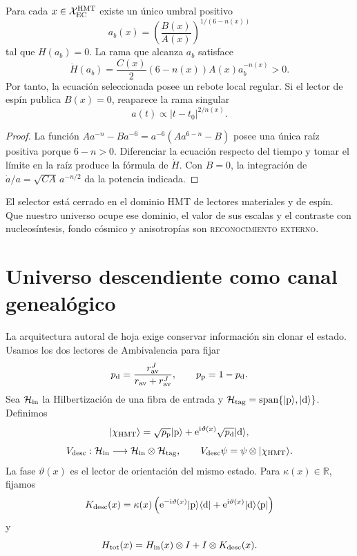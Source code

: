 \begin{theorem}
\label{thm:hmtf2-rebote-ec}
Para cada \(x\in\mathcal X_{\rm EC}^{\rm HMT}\) existe un único umbral
positivo
\[
 a_b(x)
 =\left(\frac{B(x)}{A(x)}\right)^{1/(6-n(x))}
\]
tal que \(H(a_b)=0\). La rama que alcanza \(a_b\) satisface
\[
 \dot H(a_b)
 =\frac{C(x)}2(6-n(x))A(x)a_b^{-n(x)}>0.
\]
Por tanto, la ecuación seleccionada posee un rebote local regular. Si el
lector de espín publica \(B(x)=0\), reaparece la rama singular
\[
 a(t)\propto|t-t_0|^{2/n(x)}.
\]
\end{theorem}

\begin{proof}
La función
\(A a^{-n}-B a^{-6}=a^{-6}(Aa^{6-n}-B)\) posee una única raíz positiva
porque \(6-n>0\). Diferenciar la ecuación respecto del tiempo y tomar el
límite en la raíz produce la fórmula de \(\dot H\). Con \(B=0\), la
integración de \(\dot a/a=\sqrt{CA}\,a^{-n/2}\) da la potencia indicada.
\end{proof}

El selector está cerrado en el dominio HMT de lectores materiales y de
espín. Que nuestro universo ocupe ese dominio, el valor de sus escalas y el
contraste con nucleosíntesis, fondo cósmico y anisotropías son
\textsc{reconocimiento externo}.

\section{Universo descendiente como canal genealógico}
\label{sec:hmtf2-universo-descendiente}

La arquitectura autoral de hoja exige conservar información sin clonar el
estado. Usamos los dos lectores de Ambivalencia para fijar
\[
 p_{\rm d}
 =\frac{r_{\rm av}^J}{r_{\rm av}+r_{\rm av}^J},
 \qquad
 p_{\rm p}=1-p_{\rm d}.
\]
Sea \(\mathcal H_{\rm in}\) la Hilbertización de una fibra de entrada y
\(\mathcal H_{\rm tag}=\operatorname{span}\{|{\rm p}\rangle,|{\rm d}\rangle\}\).
Definimos
\[
 |\chi_{\rm HMT}\rangle
 =\sqrt{p_{\rm p}}|{\rm p}\rangle
 +\mathrm e^{{\rm i}\vartheta(x)}
  \sqrt{p_{\rm d}}|{\rm d}\rangle,
\]
\[
 V_{\rm desc}:\mathcal H_{\rm in}
 \longrightarrow\mathcal H_{\rm in}\otimes\mathcal H_{\rm tag},
 \qquad
 V_{\rm desc}\psi=\psi\otimes|\chi_{\rm HMT}\rangle.
\]
La fase \(\vartheta(x)\) es el lector de orientación del mismo estado. Para
\(\kappa(x)\in\mathbb R\), fijamos
\[
 K_{\rm desc}(x)
 =\kappa(x)
 \left(
 \mathrm e^{-{\rm i}\vartheta(x)}
 |{\rm p}\rangle\langle{\rm d}|
 +\mathrm e^{{\rm i}\vartheta(x)}
 |{\rm d}\rangle\langle{\rm p}|
 \right)
\]
y
\[
 H_{\rm tot}(x)
 =H_{\rm in}(x)\otimes I+I\otimes K_{\rm desc}(x).
\]

